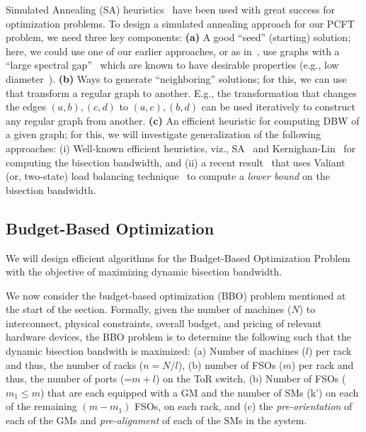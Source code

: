   Simulated Annealing (SA)
heuristics~\cite{} have been used with great success for optimization
problems. To design a simulated annealing approach for our PCFT
problem, we need three key components: {\bf (a)} A good ``seed''
(starting) solution; here, we could use one of our earlier approaches,
or as in~\cite{rewire}, use graphs with a ``large spectral
gap''~\cite{rewire,spectral,rewire-18} which are known to have
desirable properties (e.g., low diameter~\cite{spectral-diameter}).
{\bf (b)} Ways to generate ``neighboring'' solutions; for this, we can
use  that transform a regular graph to
another. E.g., the transformation that changes the edges ${(a,b),
  (c,d)}$ to ${(a,c), (b,d)}$ can be used iteratively to construct any
regular graph from another.  {\bf (c)} An efficient heuristic for
computing DBW of a given graph; for this, we will investigate
generalization of the following approaches: (i) Well-known efficient
heuristics, viz., SA~\cite{} and Kernighan-Lin~\cite{} for computing
the bisection bandwidth, and (ii) a recent result~\cite{rewire} that
uses Valiant (or, two-state) load balancing technique~\cite{valiant}
to compute a {\em lower bound} on the bisection bandwidth. 


\subsection{Budget-Based Optimization}

\begin{task}
\label{task:bbo}
We will design efficient algorithms for the Budget-Based Optimization
Problem with the objective of maximizing dynamic bisection bandwidth.
\end{task}

We now consider the budget-based optimization (BBO) problem mentioned
at the start of the section. Formally, given the number of machines
($N$) to interconnect, physical constraints, overall budget, and
pricing of relevant hardware devices, the BBO problem is to determine
the following such that the dynamic bisection bandwith is maximized:
(a) Number of machines ($l$) per rack and thus, the number of racks
($n = N/l$), (b) number of FSOs ($m$) per rack and thus, the number of
ports (=$m+l$) on the ToR switch, (b) Number of FSOs ($m_1 \leq m$)
that are each equipped with a GM and the number of SMs (k') on each of
the remaining $(m-m_1)$ FSOs, on each rack, and (c) the {\em
  pre-orientation} of each of the GMs and {\em pre-alignment} of each
of the SMs in the system.

